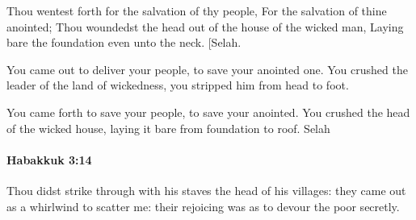 			\begin{versebox}
					\item[BHS] 
					\item[LXX] 
					\item[ASV] Thou wentest forth for the salvation of thy people, For the salvation of thine anointed; Thou woundedst the head out of the house of the wicked man, Laying bare the foundation even unto the neck. [Selah.
					\item[NIV] You came out to deliver your people, to save your anointed one. You crushed the leader of the land of wickedness, you stripped him from head to foot.
					\item[NRSV] You came forth to save your people, to save your anointed. You crushed the head of the wicked house, laying it bare from foundation to roof. Selah
			\end{versebox}

		\paragraph{Habakkuk 3:14} %
			\label{HABAKKUK-3-14}

			Thou didst strike through with his staves the head of his villages: they came out as a whirlwind to scatter me: their rejoicing was as to devour the poor secretly.

